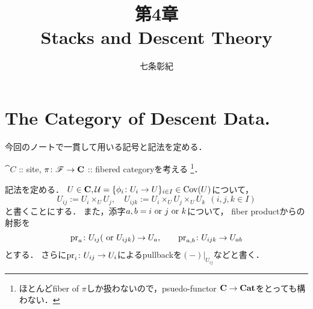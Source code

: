 \documentclass[a4paper, dvipdfmx]{jsarticle}
\begin{document}
\title{第4章 \\ Stacks and Descent Theory}
\author{七条彰紀}
\maketitle

\section{The Category of Descent Data.}
    今回のノートで一貫して用いる記号と記法を定める．

    $\cat{C}$ :: site, 
    $\pi \colon \mathscr{F} \to \mathbf{C}$ :: fibered categoryを考える
    \footnote{ ほとんどfiber of $\pi$しか扱わないので，psuedo-functor $\mathbf{C} \to \mathbf{Cat}$をとっても構わない． }．

    記法を定める．
    $U \in \mathbf{C}, \mathcal{U}=\{\phi_i \colon U_i \to U\}_{i \in I} \in \operatorname{Cov}(U)$について，
    \[ U_{ij}:=U_i \times_U U_j, \quad U_{ijk}:=U_i \times_U U_j \times_U U_k \ \ (i,j,k \in I) \]
    と書くことにする．
    また，添字$a,b=i \text{ or } j \text{ or } k$について，
    fiber productからの射影を
    \[ \operatorname{pr}_{a} \colon U_{ij} (\text{ or } U_{ijk}) \to U_{a}, \qquad \operatorname{pr}_{a,b} \colon U_{ijk} \to U_{ab} \]
    とする．
    さらに$\operatorname{pr}_{i} \colon U_{ij} \to U_{i}$によるpullbackを$(-)|_{U_{ij}}$などと書く．
\end{document}
